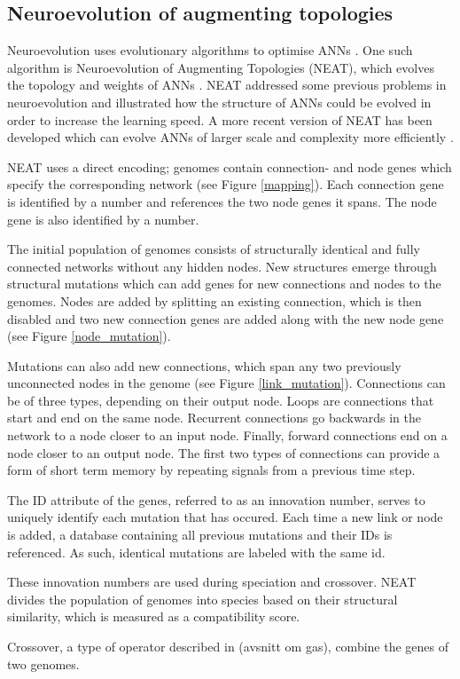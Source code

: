 \subsection{Neuroevolution of augmenting topologies}
Neuroevolution uses evolutionary algorithms to optimise ANNs \cite{neuroevolution_review}.
One such algorithm is Neuroevolution of Augmenting Topologies (NEAT), which evolves the topology and weights of ANNs
\cite{neat_main, neat_short, neat_phd}.
NEAT addressed some previous problems in neuroevolution and illustrated how the structure of ANNs could be
evolved in order to increase the learning speed. A more recent version of NEAT has been developed which can evolve ANNs of larger scale and
complexity more efficiently \cite{hyper_neat}.

NEAT uses a direct encoding; genomes contain connection- and node genes which specify the corresponding
network (see Figure \ref{mapping}). Each connection gene is identified by a number and
references the two node genes it spans. The node gene is also identified by a number.



The initial population of genomes consists of structurally identical and fully connected networks without any hidden nodes.
New structures emerge through structural mutations which can add genes for new connections and nodes to the genomes.
Nodes are added by splitting an existing connection, which is then disabled and two new connection genes are added along
with the new node gene (see Figure \ref{node_mutation}).



Mutations can also add new connections, which span any two previously unconnected nodes in the genome (see Figure \ref{link_mutation}).
Connections can be of three types, depending on their output node. Loops are connections that start and end on the same node. Recurrent
connections go backwards in the network to a node closer to an input node. Finally, forward connections end on a node closer to an output
node. The first two types of connections can provide a form of short term memory by repeating signals from a previous time step.



The ID attribute of the genes, referred to as an innovation number, serves to uniquely identify each mutation that has occured.
Each time a new link or node is added, a database containing all previous mutations and their IDs is referenced.
As such, identical mutations are labeled with the same id.

These innovation numbers are used during speciation and crossover. NEAT divides the population of genomes into species based on their structural
similarity, which is measured as a compatibility score.

Crossover, a type of operator described in (avsnitt om gas), combine the genes of two genomes.



